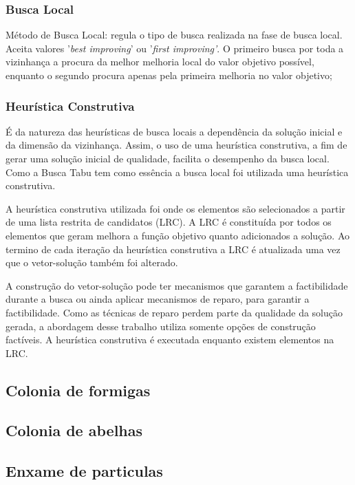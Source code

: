 \documentclass[12pt,a4paper]{article}
\begin{document}
    \subsubsection{Busca Local}

        Método de Busca Local: regula o tipo de busca realizada na fase de busca local. Aceita valores '\textit{best improving}' ou '\textit{first improving'}. O primeiro busca por toda a vizinhança
        a procura da melhor melhoria local do valor objetivo possível, enquanto o segundo procura apenas pela primeira melhoria no valor objetivo;

    \subsubsection{Heurística Construtiva}

        É da natureza das heurísticas de busca locais a dependência da solução inicial e da dimensão da vizinhança. Assim, o uso de uma heurística construtiva, a fim de gerar uma solução inicial de
        qualidade, facilita o desempenho da busca local. Como a Busca Tabu tem como essência a busca local foi utilizada uma heurística construtiva.


        A heurística construtiva utilizada foi onde os elementos são selecionados a partir de uma lista restrita de candidatos (LRC). A LRC é constituída por todos os elementos que geram
        melhora a função objetivo quanto adicionados a solução. Ao termino de cada iteração da heurística construtiva a LRC é atualizada uma vez que o vetor-solução também foi alterado.


        A construção do vetor-solução pode ter mecanismos que garantem a factibilidade durante a busca ou ainda aplicar mecanismos de reparo, para garantir a factibilidade. Como as técnicas de
        reparo perdem parte da qualidade da solução gerada, a abordagem desse trabalho utiliza somente opções de construção factíveis. A heurística construtiva é executada enquanto existem elementos
        na LRC.

        
\subsection{Colonia de formigas}

\subsection{Colonia de abelhas}

\subsection{Enxame de particulas}
\end{document}
